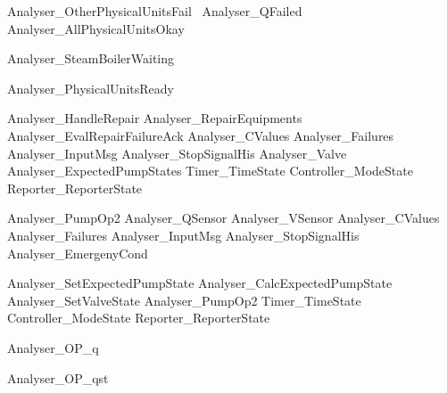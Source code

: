 \documentclass{article}
\begin{document}
\begin{zed}
	Analyser\_OtherPhysicalUnitsFail ~\lnot Analyser\_QFailed \land \lnot Analyser\_AllPhysicalUnitsOkay
\end{zed}

\begin{zed}
	Analyser\_SteamBoilerWaiting 
\end{zed}

\begin{zed}
	Analyser\_PhysicalUnitsReady 
\end{zed}

\begin{zed}
	Analyser\_HandleRepair  Analyser\_RepairEquipments \land Analyser\_EvalRepairFailureAck \land \Xi Analyser\_CValues \land \Xi Analyser\_Failures \land \Xi Analyser\_InputMsg \land \Xi Analyser\_StopSignalHis \land \Xi Analyser\_Valve \land \Xi Analyser\_ExpectedPumpStates \land \Xi Timer\_TimeState \land \Xi Controller\_ModeState \land \Xi Reporter\_ReporterState
\end{zed}

\begin{zed}
	Analyser\_PumpOp2  \Xi Analyser\_QSensor \land \Xi Analyser\_VSensor \land \Xi Analyser\_CValues \land \Xi Analyser\_Failures \land \Xi Analyser\_InputMsg \land \Xi Analyser\_StopSignalHis \land \Xi Analyser\_EmergenyCond
\end{zed}

\begin{zed}
	Analyser\_SetExpectedPumpState  Analyser\_CalcExpectedPumpState \land Analyser\_SetValveState \land Analyser\_PumpOp2 \land \Xi Timer\_TimeState \land \Xi Controller\_ModeState \land \Xi Reporter\_ReporterState
\end{zed}

\begin{zed}
	Analyser\_OP\_q 
\end{zed}

\begin{zed}
	Analyser\_OP\_qst 
\end{zed}
\end{document}
